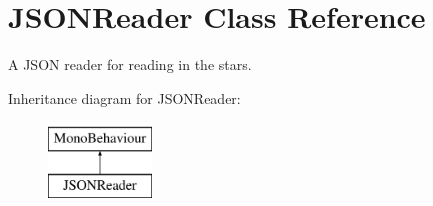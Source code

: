 \hypertarget{class_j_s_o_n_reader}{}\section{J\+S\+O\+N\+Reader Class Reference}
\label{class_j_s_o_n_reader}


A J\+S\+ON reader for reading in the stars.  


Inheritance diagram for J\+S\+O\+N\+Reader\+:\begin{figure}[H]
\begin{center}
\leavevmode
\includegraphics[height=2.000000cm]{class_j_s_o_n_reader}
\end{center}
\end{figure}
